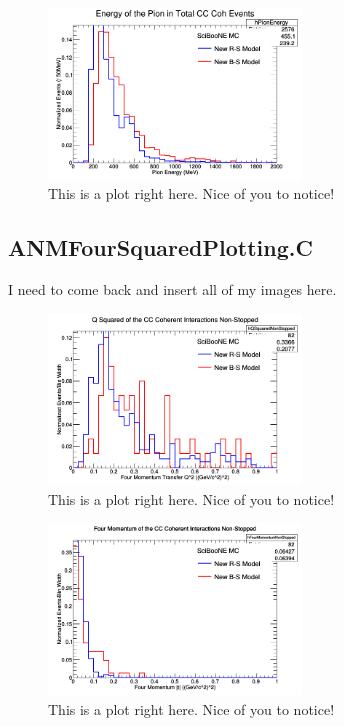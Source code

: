 \documentclass[11pt]{article}
\begin{document}
\begin{figure}[H]
\centering
\includegraphics[width=0.6\textwidth]{ANMPionPlottingImages/12-ANMPionPlotting.png}
\caption{This is a plot right here. Nice of you to notice!}
\end{figure}

\subsection{ANMFourSquaredPlotting.C}
I need to come back and insert all of my images here.

\begin{figure}[H]
\centering
\includegraphics[width=0.6\textwidth]{ANMFourSquaredPlottingImages/1-ANMFourSquaredPlotting.png}
\caption{This is a plot right here. Nice of you to notice!}
\end{figure}

\begin{figure}[H]
\centering
\includegraphics[width=0.6\textwidth]{ANMFourSquaredPlottingImages/2-ANMFourSquaredPlotting.png}
\caption{This is a plot right here. Nice of you to notice!}
\end{figure}
\end{document}
